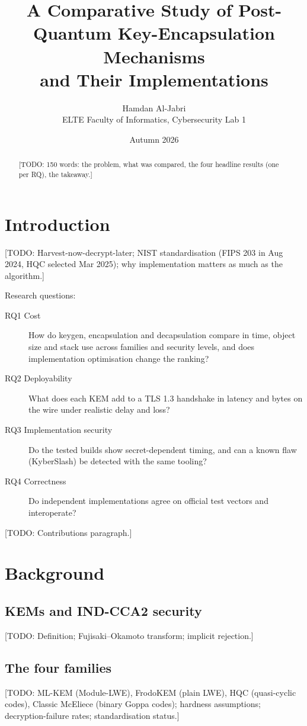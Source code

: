 \documentclass[11pt,a4paper]{article}
\title{A Comparative Study of Post-Quantum Key-Encapsulation Mechanisms\\and Their Implementations}
\author{Hamdan Al-Jabri\\ELTE Faculty of Informatics, Cybersecurity Lab 1}
\date{Autumn 2026}
\newcommand{\todo}[1]{\textcolor{red!70!black}{[TODO: #1]}}
\begin{document}
\maketitle

\begin{abstract}
\todo{150 words: the problem, what was compared, the four headline results (one per RQ), the takeaway.}
\end{abstract}

\section{Introduction}\label{sec:intro}
\todo{Harvest-now-decrypt-later; NIST standardisation (FIPS 203 in Aug 2024, HQC selected Mar 2025); why
implementation matters as much as the algorithm.}

Research questions:
\begin{description}
  \item[RQ1 Cost] How do keygen, encapsulation and decapsulation compare in time, object size and stack use
    across families and security levels, and does implementation optimisation change the ranking?
  \item[RQ2 Deployability] What does each KEM add to a TLS 1.3 handshake in latency and bytes on the wire
    under realistic delay and loss?
  \item[RQ3 Implementation security] Do the tested builds show secret-dependent timing, and can a known flaw
    (KyberSlash) be detected with the same tooling?
  \item[RQ4 Correctness] Do independent implementations agree on official test vectors and interoperate?
\end{description}
\todo{Contributions paragraph.}

\section{Background}\label{sec:background}
\subsection{KEMs and IND-CCA2 security}
\todo{Definition; Fujisaki--Okamoto transform; implicit rejection.}
\subsection{The four families}
\todo{ML-KEM (Module-LWE), FrodoKEM (plain LWE), HQC (quasi-cyclic codes), Classic McEliece (binary Goppa
codes); hardness assumptions; decryption-failure rates; standardisation status.}
\end{document}
